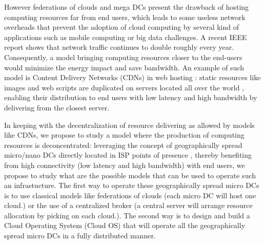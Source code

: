 However federations of clouds and mega DCs present the drawback of hosting 
computing resources far from end users, which leads to some useless network 
overheads that prevent the adoption of cloud computing by several kind of 
applications such as mobile computing or big data challenges. A recent IEEE 
report \cite{ieeenetreport:2012} shows that network traffic continues to double 
roughly every year. Consequently, a model bringing computing resources closer to
the end-users would minimize the energy impact and save bandwidth. An example of 
such model is Content Delivery Networks (CDNs) in web hosting : static resources
like images and web scripts are duplicated on servers located all over the world
, enabling their distribution to end users with low latency and high bandwidth 
by delivering from the closest server.

In keeping with the decentralization of resource delivering as allowed by models
like CDNs, we propose to study a model where the production of computing 
resources is deconcentrated: leveraging the concept of geographically spread 
micro/nano DCs directly located in ISP points of presence \cite{greenberg:2008}, 
thereby benefiting from high connectivity (low latency and high bandwidth) with 
end users, we propose to study what are the possible models that can be used to
operate such an infrastucture. The first way to operate these geographically
spread micro DCs is to use classical models like federations of clouds (each 
micro DC will host one cloud.) or the use of a centralized broker (a central 
server will arrange resource allocation by picking on each cloud.). The second 
way is to design and build a Cloud Operating System (Cloud OS) that will operate 
all the geographically spread micro DCs in a fully distributed manner. 


